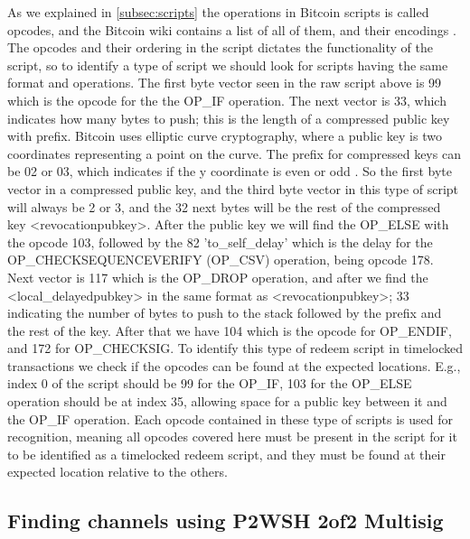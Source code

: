 As we explained in \cref{subsec:scripts} the operations in Bitcoin scripts is called opcodes, and the Bitcoin wiki contains a list of all of them, and their encodings \cite{bitcoin_wiki_scripts}. The opcodes and their ordering in the script dictates the functionality of the script, so to identify a type of script we should look for scripts having the same format and operations.
The first byte vector seen in the raw script above is 99 which is the opcode for the the OP\_IF operation. The next vector is 33, which indicates how many bytes to push; this is the length of a compressed public key with prefix. Bitcoin uses elliptic curve cryptography, where a public key is two coordinates representing a point on the curve. The prefix for compressed keys can be 02 or 03, which indicates if the y coordinate is even or odd \cite{antonopoulos2017mastering}. So the first byte vector in a compressed public key, and the third byte vector in this type of script will always be 2 or 3, and the 32 next bytes will be the rest of the compressed key <revocationpubkey>. After the public key we will find the OP\_ELSE with the opcode 103, followed by the 82 'to\_self\_delay' which is the delay for the OP\_CHECKSEQUENCEVERIFY (OP\_CSV) operation, being opcode 178. 
Next vector is 117 which is the OP\_DROP operation, and after we find the <local\_delayedpubkey> in the same format as <revocationpubkey>; 33 indicating the number of bytes to push to the stack followed by the prefix and the rest of the key. After that we have 104 which is the opcode for OP\_ENDIF, and 172 for OP\_CHECKSIG.
To identify this type of redeem script in timelocked transactions we check if the opcodes can be found at the expected locations. E.g., index 0 of the script should be 99 for the OP\_IF, 103 for the OP\_ELSE operation should be at index 35, allowing space for a public key between it and the OP\_IF operation. Each opcode contained in these type of scripts is used for recognition, meaning all opcodes covered here must be present in the script for it to be identified as a timelocked redeem script, and they must be found at their expected location relative to the others.
\\


\subsection{Finding channels using P2WSH 2of2 Multisig}

